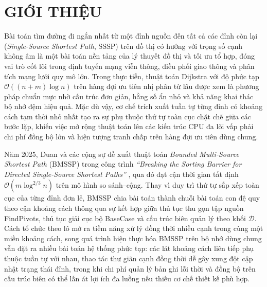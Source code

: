 \documentclass[12pt,a4paper,openany,oneside]{report}
\theoremstyle{plain}
\numberwithin{equation}{section}
\def\textsc#1{#1}%
\begin{document}
\renewcommand{\arraystretch}{1} %
\newpage


\chapter*{GIỚI THIỆU}

Bài toán tìm đường đi ngắn nhất từ một đỉnh nguồn đến tất cả các đỉnh còn lại
(\textit{Single-Source Shortest Path}, SSSP) trên đồ thị có hướng với trọng số
cạnh không âm là một bài toán nền tảng của lý thuyết đồ thị và tối ưu tổ hợp,
đóng vai trò cốt lõi trong định tuyến mạng viễn thông, điều phối giao thông và
phân tích mạng lưới quy mô lớn. Trong thực tiễn, thuật toán Dijkstra
\cite{dijkstra1959note} với độ phức tạp $\mathcal{O}((n + m)\log n)$ trên hàng
đợi ưu tiên nhị phân từ lâu được xem là phương pháp chuẩn mực nhờ cấu trúc đơn
giản, hằng số ẩn nhỏ và khả năng khai thác bộ nhớ đệm hiệu quả. Mặc dù vậy, cơ
chế trích xuất tuần tự từng đỉnh có khoảng cách tạm thời nhỏ nhất tạo ra sự phụ
thuộc thứ tự toàn cục chặt chẽ giữa các bước lặp, khiến việc mở rộng thuật toán
lên các kiến trúc CPU đa lõi vấp phải chi phí đồng bộ lớn và hiện tượng tranh
chấp trên hàng đợi ưu tiên dùng chung.

Năm 2025, Duan và các cộng sự đề xuất thuật toán \textit{Bounded Multi-Source
Shortest Path} (BMSSP) trong công trình \textit{``Breaking the Sorting Barrier
for Directed Single-Source Shortest Paths''} \cite{duan2025breaking}, qua đó đạt
cận thời gian tất định $\mathcal{O}(m\log^{2/3}n)$ trên mô hình so sánh--cộng.
Thay vì duy trì thứ tự sắp xếp toàn cục của từng đỉnh đơn lẻ, BMSSP chia bài
toán thành chuỗi bài toán con đệ quy theo cận khoảng cách thông qua sự kết hợp
giữa thủ tục thu gọn tập nguồn \textsc{FindPivots}, thủ tục giải cục bộ
\textsc{BaseCase} và cấu trúc biên quản lý theo khối $\mathcal{D}$. Cách tổ chức
theo lô mở ra tiềm năng xử lý đồng thời nhiều cạnh trong cùng một miền khoảng
cách, song quá trình hiện thực hóa BMSSP trên bộ nhớ dùng chung vẫn đặt ra nhiều
bài toán hệ thống phức tạp: các lát khoảng cách liên tiếp phụ thuộc tuần tự với
nhau, thao tác thư giãn cạnh đồng thời dễ gây xung đột cập nhật trạng thái đỉnh,
trong khi chi phí quản lý bản ghi lỗi thời và đồng bộ trên cấu trúc biên có thể
lấn át lợi ích đa luồng nếu thiếu cơ chế thiết kế phù hợp.
\end{document}
